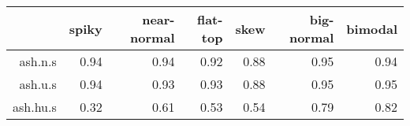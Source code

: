 \begin{tabular}{rrrrrrr}
  \toprule  & spiky & near-normal & flat-top & skew & big-normal & bimodal \\ 
  \midrule ash.n.s & 0.94 & 0.94 & 0.92 & 0.88 & 0.95 & 0.94 \\ 
  ash.u.s & 0.94 & 0.93 & 0.93 & 0.88 & 0.95 & 0.95 \\ 
  ash.hu.s & 0.32 & 0.61 & 0.53 & 0.54 & 0.79 & 0.82 \\ 
   \bottomrule \end{tabular}

